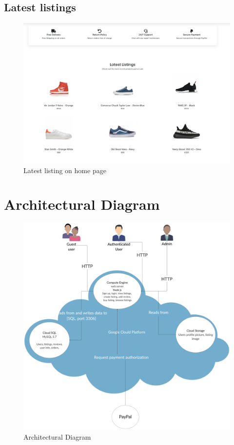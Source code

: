 \documentclass[11pt]{article}
\begin{document}
\subsection{Latest listings}
\begin{figure}[ht!]
    \centering
    \includegraphics[width=\textwidth,height=0.15\paperheight,keepaspectratio]{Diagrams/External_Interfaces/Latest_Listings.png} 
    \caption{Latest listing on home page}
    \label{fig: Latest listings}
\end{figure}

\section{Architectural Diagram}
\begin{figure}[ht!]
    \centering
    \includegraphics[width=\textwidth,height=0.6\paperheight]{Diagrams/Class/Architectural_diagram.png}
    \caption{Architectural Diagram}
    \label{fig: Architectural Diagram}
\end{figure}
\end{document}
